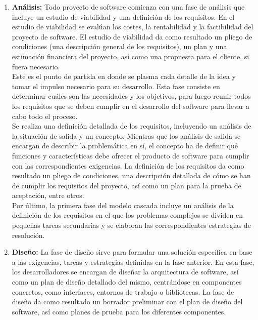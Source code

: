 \begin{enumerate}
    \item \textbf{Análisis:} Todo proyecto de software comienza con una fase de análisis que incluye un estudio de viabilidad y una definición de los requisitos. En el estudio de viabilidad se evalúan los costes, la rentabilidad y la factibilidad del proyecto de software. El estudio de viabilidad da como resultado un pliego de condiciones (una descripción general de los requisitos), un plan y una estimación financiera del proyecto, así como una propuesta para el cliente, si fuera necesario.\\
    
    Este es el punto de partida en donde se plasma cada detalle de la idea y tomar el impulso necesario para su desarrollo. Esta fase consiste en determinar cuáles son las necesidades y los objetivos, para luego reunir todos los requisitos que se deben cumplir en el desarrollo del software para llevar a cabo todo el proceso.\\
    
    Se realiza una definición detallada de los requisitos, incluyendo un análisis de la situación de salida y un concepto. Mientras que los análisis de salida se encargan de describir la problemática en sí, el concepto ha de definir qué funciones y características debe ofrecer el producto de software para cumplir con las correspondientes exigencias. La definición de los requisitos da como resultado un pliego de condiciones, una descripción detallada de cómo se han de cumplir los requisitos del proyecto, así como un plan para la prueba de aceptación, entre otros.\\

    Por último, la primera fase del modelo cascada incluye un análisis de la definición de los requisitos en el que los problemas complejos se dividen en pequeñas tareas secundarias y se elaboran las correspondientes estrategias de resolución.\\

    \item \textbf{Diseño:} La fase de diseño sirve para formular una solución específica en base a las exigencias, tareas y estrategias definidas en la fase anterior. En esta fase, los desarrolladores se encargan de diseñar la arquitectura de software, así como un plan de diseño detallado del mismo, centrándose en componentes concretos, como interfaces, entornos de trabajo o bibliotecas. La fase de diseño da como resultado un borrador preliminar con el plan de diseño del software, así como planes de prueba para los diferentes componentes.\\
    

\end{enumerate}

